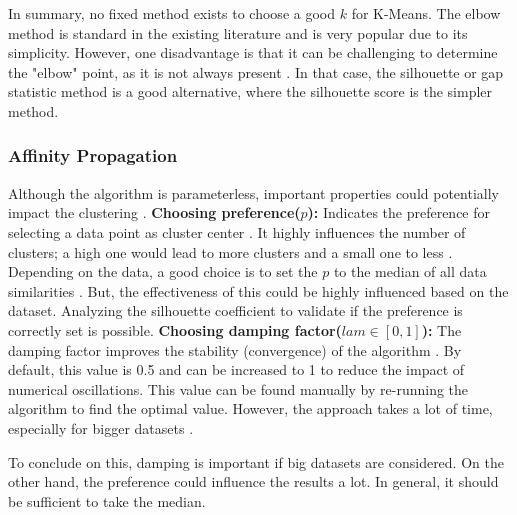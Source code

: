 In summary, no fixed method exists to choose a good $k$ for K-Means.
The elbow method is standard in the existing literature and is very popular due to its simplicity.
However, one disadvantage is that it can be challenging to determine the "elbow" point, as it is not always present \citep{kodinariya_review_2013}.
In that case, the silhouette or gap statistic method is a good alternative, where the silhouette score is the simpler method.
\subsubsection{Affinity Propagation} \label{theory:clustering-ap}
Although the algorithm is parameterless, important properties could potentially impact the clustering \citep{wang_adaptive_2007}. \newline
\textbf{Choosing preference($p$): }
Indicates the preference for selecting a data point as cluster center \citep{wang_adaptive_2007}.
It highly influences the number of clusters; a high one would lead to more clusters and a small one to less \citep{moiane_evaluation_2018}.
Depending on the data, a good choice is to set the $p$ to the median of all data similarities \citep{wang_adaptive_2007}.
But, the effectiveness of this could be highly influenced based on the dataset.
Analyzing the silhouette coefficient \citep{moiane_evaluation_2018} to validate if the preference is correctly set is possible.
\newline
\textbf{Choosing damping factor($lam \in [0,1] $):}
The damping factor improves the stability (convergence) of the algorithm \citep{wang_adaptive_2007}.
By default, this value is 0.5 and can be increased to 1 to reduce the impact of numerical oscillations.
This value can be found manually by re-running the algorithm to find the optimal value.
However, the approach takes a lot of time, especially for bigger datasets \citep{wang_adaptive_2007}. \newline

To conclude on this, damping is important if big datasets are considered.
On the other hand, the preference could influence the results a lot.
In general, it should be sufficient to take the median.
